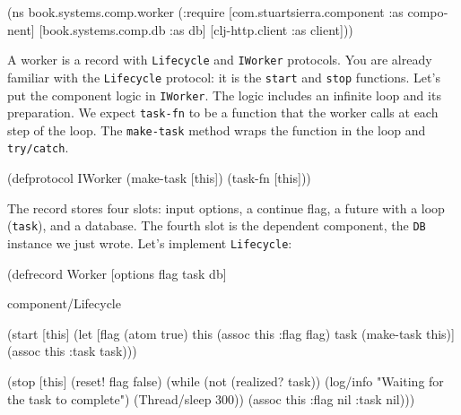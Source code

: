 \else

\begin{english}
  \begin{clojure}
(ns book.systems.comp.worker
  (:require
   [com.stuartsierra.component :as component]
   [book.systems.comp.db :as db]
   [clj-http.client :as client]))
  \end{clojure}
\end{english}

\fi



A worker is a record with \verb|Lifecycle| and \verb|IWorker| protocols. You are already familiar with the \verb|Lifecycle| protocol: it is the \verb|start| and \verb|stop| functions. Let's put the component logic in \verb|IWorker|. The logic includes an infinite loop and its preparation. We expect \verb|task-fn| to be a function that the worker calls at each step of the loop. The \verb|make-task| method wraps the function in the loop and \verb|try/catch|.

\begin{english}
  \begin{clojure}
(defprotocol IWorker
  (make-task [this])
  (task-fn [this]))
  \end{clojure}
\end{english}

The record stores four slots: input options, a continue flag, a future with a loop (\verb|task|), and a database. The fourth slot is the dependent component, the \verb|DB| instance we just wrote. Let's implement \verb|Lifecycle|:

\ifnarrow

\begin{english}
  \begin{clojure/lines}
(defrecord Worker
  [options flag task db]

  component/Lifecycle

  (start [this]
    (let [flag (atom true)
          this (assoc this :flag flag)
          task (make-task this)]
      (assoc this :task task)))

  (stop [this]
    (reset! flag false)
    (while (not (realized? task))
      (log/info
        "Waiting for
             the task to complete")
      (Thread/sleep 300))
    (assoc this :flag nil :task nil)))
  \end{clojure/lines}
\end{english}

\else

